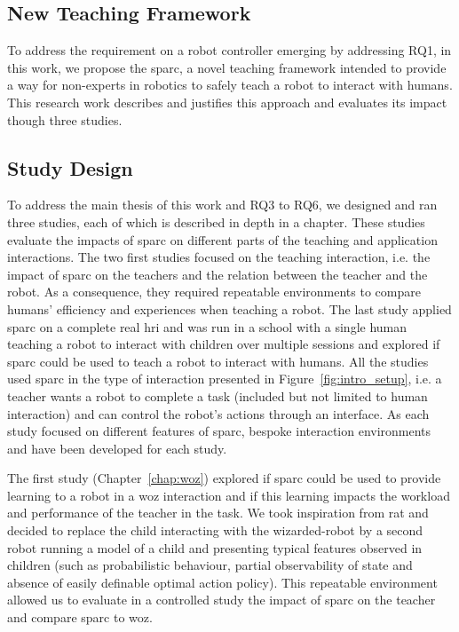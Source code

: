 \subsection{New Teaching Framework}
To address the requirement on a robot controller emerging by addressing RQ1, in this work, we propose the \gls{sparc}, a novel teaching framework intended to provide a way for non-experts in robotics to safely teach a robot to interact with humans. This research work describes and justifies this approach and evaluates its impact though three studies.

\subsection{Study Design} 

To address the main thesis of this work and RQ3 to RQ6, we designed and ran three studies, each of which is described in depth in a chapter. These studies evaluate the impacts of \gls{sparc} on different parts of the teaching and application interactions. The two first studies focused on the teaching interaction, i.e. the impact of \gls{sparc} on the teachers and the relation between the teacher and the robot. As a consequence, they required repeatable environments to compare humans' efficiency and experiences when teaching a robot. The last study applied \gls{sparc} on a complete real \gls{hri} and was run in a school with a single human teaching a robot to interact with children over multiple sessions and explored if \gls{sparc} could be used to teach a robot to interact with humans. All the studies used \gls{sparc} in the type of interaction presented in Figure~\ref{fig:intro_setup}, i.e. a teacher wants a robot to complete a task (included but not limited to human interaction) and can control the robot's actions through an interface. As each study focused on different features of \gls{sparc}, bespoke interaction environments and  have been developed for each study.

The first study (Chapter~\ref{chap:woz}) explored if \gls{sparc} could be used to provide learning to a robot in a \gls{woz} interaction and if this learning impacts the workload and performance of the teacher in the task. We took inspiration from \gls{rat} and decided to replace the child interacting with the wizarded-robot by a second robot running a model of a child and presenting typical features observed in children (such as probabilistic behaviour, partial observability of state and absence of easily definable optimal action policy). This repeatable environment allowed us to evaluate in a controlled study the impact of \gls{sparc} on the teacher and compare \gls{sparc} to \gls{woz}.

